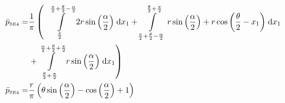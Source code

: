 \begin{align}
    \bar{p}_{\text{\tiny{SE4}}} =&\frac{1}{\pi} \left(\;\;\int\limits_{\frac{\pi}{2}}^{\frac{\pi}{2} + \frac{\theta}{2} - \frac{\alpha}{2}}2 r \sin{\left (\frac{\alpha}{2} \right )}\;\mathrm{d}x_{1}+\int\limits_{\frac{\pi}{2} + \frac{\theta}{2} - \frac{\alpha}{2}}^{\frac{\theta}{2} + \frac{\pi}{2}}r \sin{\left (\frac{\alpha}{2} \right )} + r \cos{\left (\frac{\theta}{2} - x_{1} \right )}\;\mathrm{d}x_{1}\right.\notag\\
 &\left.+\int\limits_{\frac{\theta}{2} + \frac{\pi}{2}}^{\frac{\alpha}{2} + \frac{\theta}{2} + \frac{\pi}{2}}r \sin{\left (\frac{\alpha}{2} \right )}\;\mathrm{d}x_{1}\right)\label{pSW4Def}\\
    \bar{p}_{\text{\tiny{SE4}}}  =& \frac{r}{\pi} \left(\theta \sin{\left (\frac{\alpha}{2} \right )} - \cos{\left (\frac{\alpha}{2} \right )} + 1\right)\label{pSW4Sln}
\end{align}
